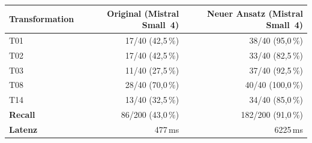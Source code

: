 \begin{tabular}{l r r}
\toprule
\textbf{Transformation} & Original (Mistral Small~4) & \textbf{Neuer Ansatz (Mistral Small~4)} \\
\midrule
T01 & 17/40 (42{,}5\,\%) & 38/40 (95{,}0\,\%) \\
T02 & 17/40 (42{,}5\,\%) & 33/40 (82{,}5\,\%) \\
T03 & 11/40 (27{,}5\,\%) & 37/40 (92{,}5\,\%) \\
T08 & 28/40 (70{,}0\,\%) & 40/40 (100{,}0\,\%) \\
T14 & 13/40 (32{,}5\,\%) & 34/40 (85{,}0\,\%) \\
\midrule
\textbf{Recall} & 86/200 (43{,}0\,\%) & 182/200 (91{,}0\,\%) \\
\textbf{Latenz} & 477\,ms & 6225\,ms \\
\bottomrule
\end{tabular}
